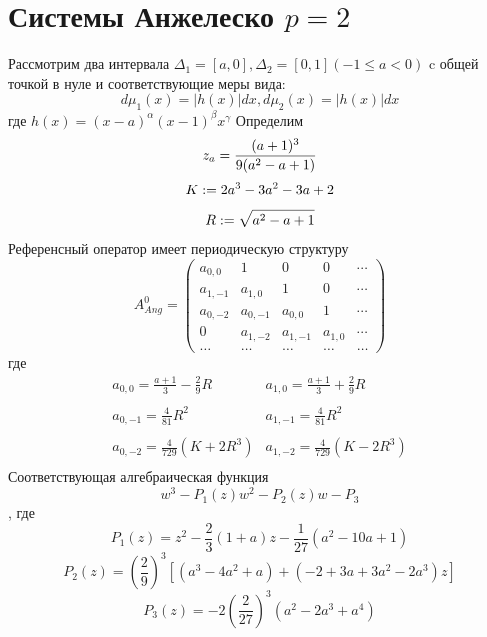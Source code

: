 \documentclass[12pt, a4paper]{report}
\begin{document}
\newpage
\section{Системы Анжелеско $p=2$}
Рассмотрим два интервала $\Delta_1=[a,0], \Delta_2=[0,1] (-1 \leq a <0)$ c общей точкой в нуле и соответствующие меры вида:
$$
d\mu_1(x)=|h(x)|dx, d\mu_2(x)=|h(x)|dx
$$ 
где $h(x)=(x-a)^\alpha(x-1)^\beta x^\gamma$
Определим
$$
z_a=\frac{(a+1)^3}{9(a^2-a+1)} \\
$$
$$
K :=2a^3-3a^2-3a+2 \\ 
$$
$$
R :=\sqrt{a^2-a+1} \\
$$
Референсный оператор имеет периодическую структуру
$$
A^0_{Ang}=
\left(\begin{array}{cccccccccccc}
a_{0,0}  & 1 		& 0 	  & 0 		 &  \cdots \\
a_{1,-1} & a_{1,0}  & 1 	  & 0 		 &  \cdots \\
a_{0,-2} & a_{0,-1} & a_{0,0} & 1 		 &  \cdots \\
0 		 & a_{1,-2} & a_{1,-1} & a_{1,0} &  \cdots \\
\ldots & \ldots & \ldots & \ldots & \ldots
\end{array}\right)
$$
где 
$$
\begin{array}{llllllllllllllll}
a_{0,0} = \displaystyle\frac {a+1}{3}-\displaystyle\frac{2}{9}R & a_{1,0}=\displaystyle\frac{a+1}{3}+\displaystyle\frac{2}{9}R \\ \\ 
a_{0,-1}= \displaystyle\frac {4}{81}R^2 & a_{1,-1}=\displaystyle\frac{4}{81}R^2 \\ \\
a_{0,-2}= \displaystyle\frac {4}{729}(K+2R^3) & a_{1,-2}=\displaystyle\frac{4}{729}(K-2R^3) \\
\end{array}
$$
Соответствующая алгебраическая функция
$$
w^3-P_1(z)w^2-P_2(z)w-P_3
$$
, где
$$
P_1(z)=z^2-\frac{2}{3}(1+a)z-\frac{1}{27}(a^2-10a+1)
$$
$$
P_2(z)=\left(\frac{2}{9}\right)^3[(a^3-4a^2+a)+(-2+3a+3a^2-2a^3)z]
$$
$$
P_3(z)=-2 \left(\frac{2}{27} \right)^3 (a^2-2a^3+a^4)
$$
\end{document}
